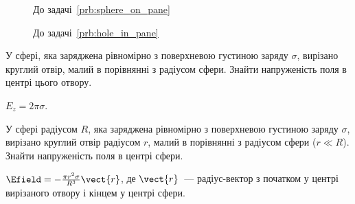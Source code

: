 \begin{figure}[h!]\centering
	\begin{minipage}[t]{0.45\linewidth}\centering
		\caption{До задачі~\ref{prb:sphere_on_pane}}
		\label{sphere_on_pane}
	\end{minipage}
	\begin{minipage}[t]{0.45\linewidth}\centering
		\caption{До задачі~\ref{prb:hole_in_pane}}
		\label{hole_in_pane}
	\end{minipage}
\end{figure}

\begin{problem}
У сфері, яка заряджена рівномірно з поверхневою густиною заряду $\sigma$, вирізано круглий отвір, малий в порівнянні з радіусом сфери. Знайти напруженість поля в центрі цього отвору.
\begin{solution}
	$E_z = 2\pi\sigma$.
\end{solution}
\end{problem}

\begin{problem}
У сфері радіусом $R$, яка заряджена рівномірно з поверхневою густиною заряду $\sigma$, вирізано круглий отвір радіусом $r$, малий в порівнянні з радіусом сфери ($r \ll R$). Знайти напруженість поля в центрі сфери.
\begin{solution}
	$\Efield =-\frac{\pi r^2 \sigma}{R^3}\vect{r}$, де $\vect{r}$~--- радіус-вектор з початком у центрі вирізаного отвору і кінцем у центрі сфери.
\end{solution}
\end{problem}

